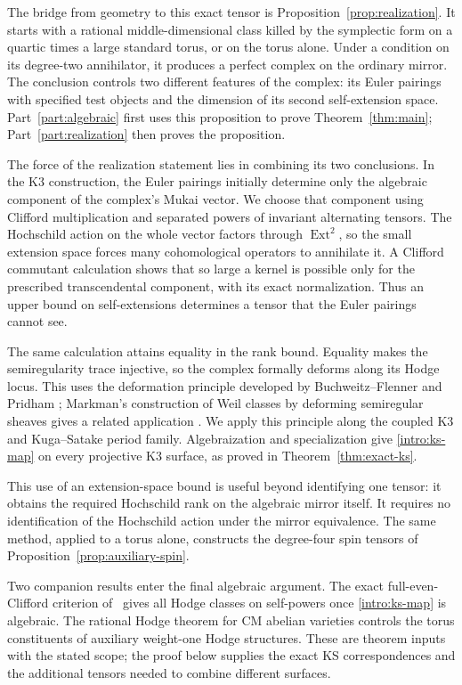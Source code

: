 \documentclass[11pt]{article}
\numberwithin{equation}{section}
\theoremstyle{definition}
\theoremstyle{remark}
\begin{document}
The bridge from geometry to this exact tensor is
Proposition~\ref{prop:realization}.  It starts with a rational
middle-dimensional class killed by the symplectic form on a quartic
times a large standard torus, or on the torus alone.  Under a condition
on its degree-two annihilator, it produces a perfect complex on the
ordinary mirror.
The conclusion controls two different features of the complex:
its Euler pairings with specified test objects and the dimension of
its second self-extension space.  Part~\ref{part:algebraic} first
uses this proposition to prove Theorem~\ref{thm:main};
Part~\ref{part:realization} then proves the proposition.

The force of the realization statement lies in combining its two
conclusions.  In the K3 construction, the Euler pairings initially
determine only the algebraic component of the complex's Mukai vector.
We choose that component
using Clifford multiplication and separated powers of invariant
alternating tensors.  The Hochschild action on the whole vector
factors through \(\operatorname{Ext}^2\), so the small extension space forces
many cohomological operators to annihilate it.  A Clifford commutant
calculation shows that so large a kernel is possible only for the
prescribed transcendental component, with its exact normalization.
Thus an upper bound on self-extensions determines a tensor that the
Euler pairings cannot see.

The same calculation attains equality in the rank bound.  Equality
makes the semiregularity trace injective, so the complex formally
deforms along its Hodge locus.  This uses the deformation
principle developed by
Buchweitz--Flenner and Pridham
\cite{BuchweitzFlennerSemiregularity,PridhamSemiregularity};
Markman's construction of Weil classes by deforming semiregular
sheaves gives a related application
\cite[Sections~7--9]{MarkmanSecant}.  We apply this principle along
the coupled K3 and Kuga--Satake period family.  Algebraization and
specialization give \eqref{intro:ks-map} on every projective K3
surface, as proved in
Theorem~\ref{thm:exact-ks}.

This use of an extension-space bound is useful beyond identifying
one tensor: it obtains the required Hochschild rank on the algebraic
mirror itself.  It requires no identification of the Hochschild
action under the mirror equivalence.  The same method, applied to a
torus alone, constructs the degree-four spin tensors of
Proposition~\ref{prop:auxiliary-spin}.

Two companion results enter the final algebraic argument.  The exact
full-even-Clifford criterion of~\cite[Theorem~1.1]{AKS} gives all
Hodge classes on self-powers once \eqref{intro:ks-map} is algebraic.
The rational Hodge theorem for CM abelian varieties
\cite[Theorem~1.1]{CM} controls the torus constituents of auxiliary
weight-one Hodge structures.  These are theorem inputs with the stated
scope; the proof below supplies the exact KS correspondences and the
additional tensors needed to combine different surfaces.
\end{document}
